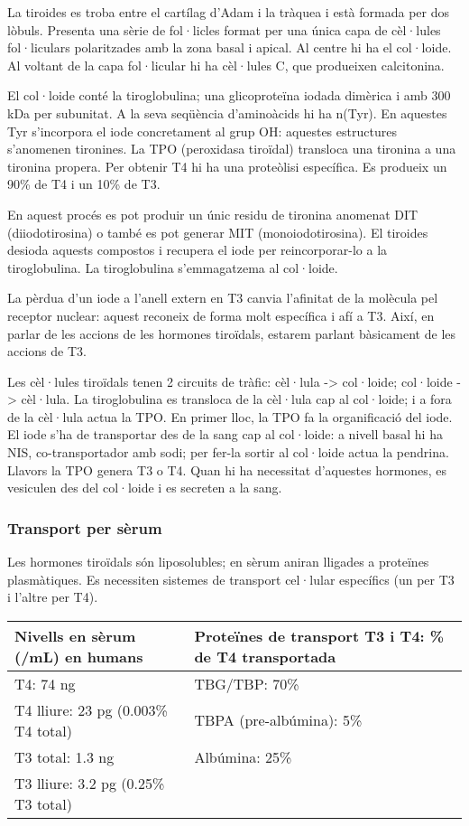 La tiroides es troba entre el cartílag d'Adam i la tràquea i està
formada per dos lòbuls. Presenta una sèrie de fol·licles format per
una única capa de cèl·lules fol·liculars polaritzades amb la zona
basal i apical. Al centre hi ha el col·loide.  Al voltant de la capa
fol·licular hi ha cèl·lules C, que produeixen calcitonina.

El col·loide conté la tiroglobulina; una glicoproteïna iodada dimèrica
i amb 300 kDa per subunitat. A la seva seqüència d'aminoàcids hi ha
n(Tyr). En aquestes Tyr s'incorpora el iode concretament al grup OH:
aquestes estructures s'anomenen tironines. La TPO (peroxidasa
tiroïdal) transloca una tironina a una tironina propera. Per obtenir
T4 hi ha una proteòlisi específica. Es produeix un 90\% de T4 i un
10\% de T3.

En aquest procés es pot produir un únic residu de tironina anomenat
DIT (diiodotirosina) o també es pot generar MIT (monoiodotirosina). El
tiroides desioda aquests compostos i recupera el iode per
reincorporar-lo a la tiroglobulina. La tiroglobulina s'emmagatzema al col·loide.

La pèrdua d'un iode a l'anell extern en T3 canvia l'afinitat de la
molècula pel receptor nuclear: aquest reconeix de forma molt
específica i afí a T3. Així, en parlar de les accions de les hormones
tiroïdals, estarem parlant bàsicament de les accions de T3.

Les cèl·lules tiroïdals tenen 2 circuits de tràfic: cèl·lula ->
col·loide; col·loide -> cèl·lula. La tiroglobulina es transloca de la
cèl·lula cap al col·loide; i a fora de la cèl·lula actua la TPO. En
primer lloc, la TPO fa la organificació del iode. El iode s'ha de
transportar des de la sang cap al col·loide: a nivell basal hi ha NIS,
co-transportador amb sodi; per fer-la sortir al col·loide actua la
pendrina. Llavors la TPO genera T3 o T4. Quan hi ha necessitat
d'aquestes hormones, es vesiculen des del col·loide i es secreten a la
sang.

\subsubsection{Transport per sèrum}
\label{sec:transport-per-serum}
Les hormones tiroïdals són liposolubles; en sèrum aniran lligades a
proteïnes plasmàtiques. Es necessiten sistemes de transport cel·lular
específics (un per T3 i l'altre per T4). 

\begin{table}[H]
\centering
\begin{tabular}{>{\raggedright}m{5.2cm}>{\raggedright}m{5cm}}
\hline 
\textbf{Nivells en sèrum (/mL) en humans} & \textbf{Proteïnes de transport T3 i T4: \% de T4 transportada}\tabularnewline
\hline 
T4: 74 ng & TBG/TBP: 70\%\tabularnewline
T4 lliure: 23 pg (0.003\% T4 total) & TBPA (pre-albúmina): 5\%\tabularnewline
T3 total: 1.3 ng & Albúmina: 25\%\tabularnewline
T3 lliure: 3.2 pg (0.25\% T3 total) & \tabularnewline
\hline 
\end{tabular}
\end{table}

